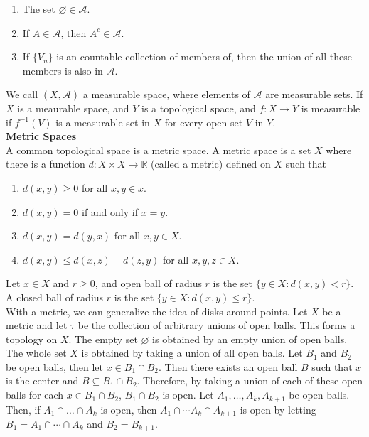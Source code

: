 \documentclass[12pt]{article}
\let\emptyset\varnothing
\begin{document}
\begin{enumerate}[itemsep=0pt, parsep=0pt, topsep=0pt, partopsep=0pt]
\item The set $\emptyset \in \mathcal{A}$. 
\item If $A \in \mathcal{A}$, then $A^c \in \mathcal{A}$.  
\item If $\{V_n\}$ is an countable collection of members of, then the union of all these members is also in $\mathcal{A}$.
\end{enumerate}
\noindent We call $(X,\mathcal{A})$ a measurable space, where elements of $\mathcal{A}$ are measurable sets. If $X$ is a meaurable space, and $Y$ is a topological space, and $f:X\rightarrow Y$ is measurable if $f^{-1}(V)$ is a measurable set in $X$ for every open set $V$ in $Y$. \\

\noindent \textbf{Metric Spaces} \\
\noindent A common topological space is a metric space. A metric space is a set $X$ where there is a function $d:X \times X \rightarrow \mathbb{R}$ (called a metric) defined on $X$ such that
\begin{enumerate}[itemsep=0pt, parsep=0pt, topsep=0pt, partopsep=0pt]
\item $d(x,y) \geq 0$ for all $x,y\in x$. 
\item $d(x,y)=0$ if and only if $x=y$.
\item $d(x,y) = d(y,x)$ for all $x,y \in X$.
\item $d(x,y) \leq d(x,z)+d(z,y)$ for all $x,y,z \in X$. 
\end{enumerate}

\noindent Let $x \in X$ and $r \geq 0$, and open ball of radius $r$ is the set $\{y \in X: d(x,y) < r\}$. A closed ball of radius $r$ is the set $\{y \in X: d(x,y) \leq r\}$. \\

\noindent With a metric, we can generalize the idea of disks around points. Let $X$ be a metric and let $\tau$ be the collection of arbitrary unions of open balls. This forms a topology on $X$. The empty set $\emptyset$ is obtained by an empty union of open balls. The whole set $X$ is obtained by taking a union of all open balls. Let $B_1$ and $B_2$ be open balls, then let $x \in B_1 \cap B_2$. Then there exists an open ball $B$ such that $x$ is the center and $B \subseteq B_1 \cap B_2$. Therefore, by taking a union of each of these open balls for each $x \in B_1 \cap B_2$, $B_1\cap B_2$ is open. Let $A_1, \dots, A_k, A_{k+1}$ be open balls. Then, if $A_1 \cap \dots \cap A_k$ is open, then $A_1 \cap \cdots A_k \cap A_{k+1}$ is open by letting $B_1 = A_1 \cap \cdots \cap A_k$ and $B_2 = B_{k+1}$. \\
\end{document}

